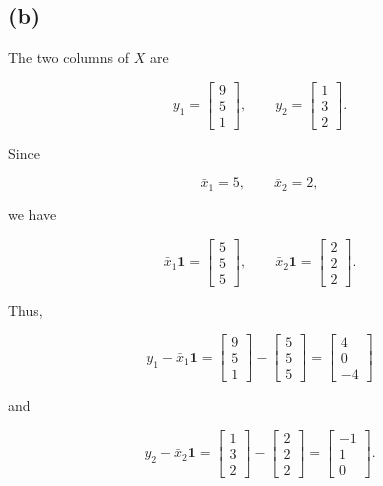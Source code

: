 \documentclass[12pt]{article}
\begin{document}
\subsection*{(b)}

The two columns of $X$ are

$$
y_1=
\begin{bmatrix}
9\\5\\1
\end{bmatrix},
\qquad
y_2=
\begin{bmatrix}
1\\3\\2
\end{bmatrix}.
$$

Since

$$
\bar{x}_1=5,\qquad \bar{x}_2=2,
$$

we have

$$
\bar{x}_1\mathbf{1}
=
\begin{bmatrix}
5\\5\\5
\end{bmatrix},
\qquad
\bar{x}_2\mathbf{1}
=
\begin{bmatrix}
2\\2\\2
\end{bmatrix}.
$$

Thus,

$$
y_1-\bar{x}_1\mathbf{1}
=
\begin{bmatrix}
9\\5\\1
\end{bmatrix}
-
\begin{bmatrix}
5\\5\\5
\end{bmatrix}
=
\boxed{
\begin{bmatrix}
4\\0\\-4
\end{bmatrix}}
$$

and

$$
y_2-\bar{x}_2\mathbf{1}
=
\begin{bmatrix}
1\\3\\2
\end{bmatrix}
-
\begin{bmatrix}
2\\2\\2
\end{bmatrix}
=
\boxed{
\begin{bmatrix}
-1\\1\\0
\end{bmatrix}}.
$$
\end{document}
